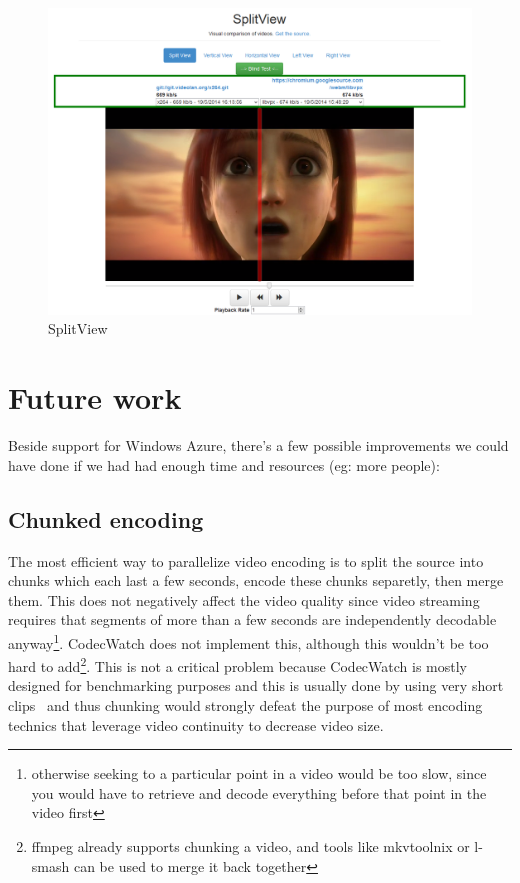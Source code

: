 \documentclass[a4paper,12pt]{article}
\begin{document}
\begin{figure}[!h] \centering
  \includegraphics[width=1\textwidth]{figures/split1.png}
  \caption{SplitView}
  \label{fig:split1}
\end{figure}

\section{Future work}
Beside support for Windows Azure, there's a few possible improvements we could
have done if we had had enough time and resources (eg: more people):
\subsection{Chunked encoding}
The most efficient way to parallelize video encoding is to split the source into
chunks which each last a few seconds, encode these chunks separetly, then merge
them. This does not negatively affect the video quality since video streaming
requires that segments of more than a few seconds are independently decodable
anyway\footnote{otherwise seeking to a particular point in a video would be too
slow, since you would have to retrieve and decode everything before that point
in the video first}. CodecWatch does not implement this, although this wouldn't
be too hard to add\footnote{ffmpeg already supports chunking a video, and tools
like mkvtoolnix or l-smash can be used to merge it back together}. This is not a
critical problem because CodecWatch is mostly designed for benchmarking purposes
and this is usually done by using very short clips~\cite{derf} and thus chunking
would strongly defeat the purpose of most encoding technics that leverage video
continuity to decrease video size.
\end{document}
